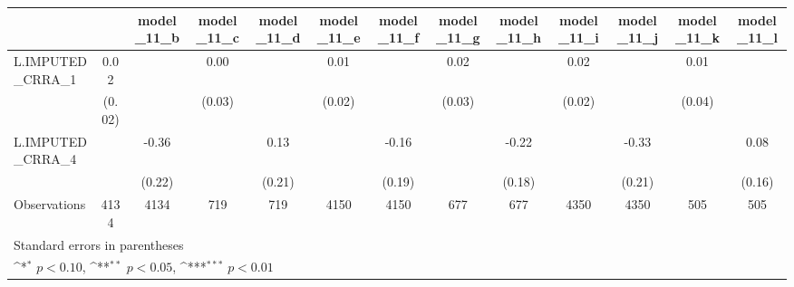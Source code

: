 {
\def\sym#1{\ifmmode^{#1}\else\(^{#1}\)\fi}
\begin{tabular}{l*{12}{c}}
\toprule
                &\multicolumn{1}{c}{}&\multicolumn{1}{c}{model\_11\_b}&\multicolumn{1}{c}{model\_11\_c}&\multicolumn{1}{c}{model\_11\_d}&\multicolumn{1}{c}{model\_11\_e}&\multicolumn{1}{c}{model\_11\_f}&\multicolumn{1}{c}{model\_11\_g}&\multicolumn{1}{c}{model\_11\_h}&\multicolumn{1}{c}{model\_11\_i}&\multicolumn{1}{c}{model\_11\_j}&\multicolumn{1}{c}{model\_11\_k}&\multicolumn{1}{c}{model\_11\_l}\\
\midrule
L.IMPUTED\_CRRA\_1&     0.02         &                  &     0.00         &                  &     0.01         &                  &     0.02         &                  &     0.02         &                  &     0.01         &                  \\
                &   (0.02)         &                  &   (0.03)         &                  &   (0.02)         &                  &   (0.03)         &                  &   (0.02)         &                  &   (0.04)         &                  \\
\addlinespace
L.IMPUTED\_CRRA\_4&                  &    -0.36         &                  &     0.13         &                  &    -0.16         &                  &    -0.22         &                  &    -0.33         &                  &     0.08         \\
                &                  &   (0.22)         &                  &   (0.21)         &                  &   (0.19)         &                  &   (0.18)         &                  &   (0.21)         &                  &   (0.16)         \\
\midrule
Observations    &     4134         &     4134         &      719         &      719         &     4150         &     4150         &      677         &      677         &     4350         &     4350         &      505         &      505         \\
\bottomrule
\multicolumn{13}{l}{\footnotesize Standard errors in parentheses}\\
\multicolumn{13}{l}{\footnotesize \sym{*} \(p<0.10\), \sym{**} \(p<0.05\), \sym{***} \(p<0.01\)}\\
\end{tabular}
}
